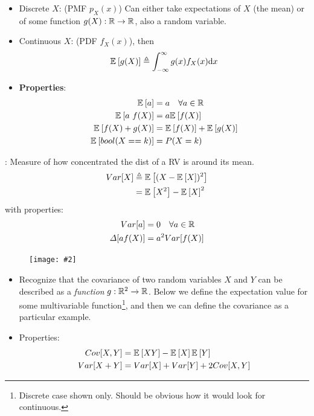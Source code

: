 \documentclass[12pt]{article}
\newcommand\myfig[2][0.3\textwidth]{\begin{figure}[h!]\centering\texttt{[image: \#2]}\end{figure}}
\newcommand{\myspace}{\vspace{2\bigskipamount}}
\newcommand\p{\Needspace{10\baselineskip} \noindent}
\begin{document}
\myspace
\p {}\vspace{-1em}
\begin{itemize}[--]
	\item Discrete $X$: (PMF $p_X(x)$) Can either take expectations of $X$ (the mean) or of some function $g(X): \mathbb{R} \rightarrow \mathbb{R}$, also a random variable.
	
	\item Continuous $X$: (PDF $f_X(x)$), then 
	\begin{align}
	\mathbb{E}_{}\left[g(X)\right] \triangleq \int_{-\infty}^{\infty} g(x) f_X(x) \mathrm{d}x
	\end{align}
	
	\item \textbf{Properties}:
	\begin{align}
	\mathbb{E}_{}\left[a\right] 		&= a \quad \forall a \in \mathbb{R} \\
	\mathbb{E}_{}\left[a~f(X)\right] 	&= a \mathbb{E}_{}\left[f(X)\right] \\
	\mathbb{E}_{}\left[f(X) + g(X)\right] &= \mathbb{E}_{}\left[f(X)\right] + \mathbb{E}_{}\left[g(X)\right] \\
	\mathbb{E}_{}\left[bool(X == k)\right] &= P(X = k)
	\end{align}
\end{itemize}

\myspace
\p {}: Measure of how concentrated the dist of a RV is around its mean. 
\begin{align}
Var[X] &\triangleq \mathbb{E}_{}\left[(X - \mathbb{E}_{}\left[X\right])^2\right] \\
&= \mathbb{E}_{}\left[X^2\right] - \mathbb{E}_{}\left[X\right]^2
\end{align}
with properties:
\begin{align}
Var[a] &= 0 \quad \forall a \in \mathbb{R} \\
\varDelta[a f(X)] &= a^2 Var[f(X)]
\end{align}

\myfig{CommonRandomVariables.PNG}

\p {}\vspace{-1em}
\begin{itemize}[--]
	\item Recognize that the covariance of two random variables $X$ and $Y$ can be described as a \textit{function} $g: \mathbb{R}^2 \rightarrow \mathbb{R}$. Below we define the expectation value for some multivariable function\footnote{Discrete case shown only. Should be obvious how it would look for continuous.}, and then we can define the covariance as a particular example. 
	\item Properties:
	\begin{align}
	Cov[X, Y] &= \mathbb{E}_{}\left[XY\right] - \mathbb{E}_{}\left[X\right]\mathbb{E}_{}\left[Y\right] \\
	Var[X + Y] &= Var[X] + Var[Y] + 2Cov[X, Y]
	\end{align}
\end{itemize}
\end{document}
